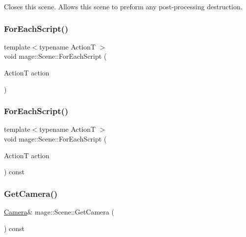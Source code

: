 Closes this scene. Allows this scene to preform any post-\/processing destruction. \hypertarget{classmage_1_1_scene_a272a7aa84e116c58c24f01731bbcc640}{}\label{classmage_1_1_scene_a272a7aa84e116c58c24f01731bbcc640} 
\subsubsection{\texorpdfstring{For\+Each\+Script()}{ForEachScript()}\hspace{0.1cm}{\footnotesize\ttfamily [1/2]}}
{\footnotesize\ttfamily template$<$typename ActionT $>$ \\
void mage\+::\+Scene\+::\+For\+Each\+Script (\begin{DoxyParamCaption}\item[{ActionT}]{action }\end{DoxyParamCaption})}

\hypertarget{classmage_1_1_scene_a4d16d973adce12868b9a0df9d92ef6d6}{}\label{classmage_1_1_scene_a4d16d973adce12868b9a0df9d92ef6d6} 
\subsubsection{\texorpdfstring{For\+Each\+Script()}{ForEachScript()}\hspace{0.1cm}{\footnotesize\ttfamily [2/2]}}
{\footnotesize\ttfamily template$<$typename ActionT $>$ \\
void mage\+::\+Scene\+::\+For\+Each\+Script (\begin{DoxyParamCaption}\item[{ActionT}]{action }\end{DoxyParamCaption}) const}

\hypertarget{classmage_1_1_scene_a8b2ad419541a51353d6f56ba12f43d79}{}\label{classmage_1_1_scene_a8b2ad419541a51353d6f56ba12f43d79} 
\subsubsection{\texorpdfstring{Get\+Camera()}{GetCamera()}}
{\footnotesize\ttfamily \hyperlink{classmage_1_1_camera}{Camera}\& mage\+::\+Scene\+::\+Get\+Camera (\begin{DoxyParamCaption}{ }\end{DoxyParamCaption}) const}

